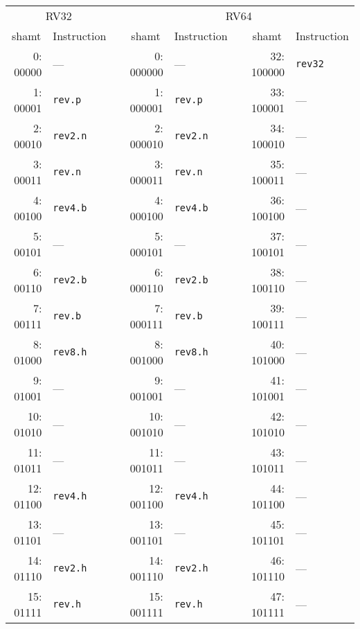 \begin{table}[t]
\begin{small}
\begin{center}
\begin{tabular}{r l p{0.5in} r l p{0.3in} r l}

\multicolumn{2}{c}{RV32} & &
\multicolumn{5}{c}{RV64} \\

\cline{1-2}
\cline{4-8}

\multicolumn{1}{c}{shamt} & Instruction & &
\multicolumn{1}{c}{shamt} & Instruction & &
\multicolumn{1}{c}{shamt} & Instruction \\

\cline{1-2}
\cline{4-5}
\cline{7-8}

 0: 00000 & ---           &   &  0: 000000 & ---           &   & 32: 100000 & {\tt rev32} \\
 1: 00001 & {\tt rev.p}   &   &  1: 000001 & {\tt rev.p}   &   & 33: 100001 & ---         \\
 2: 00010 & {\tt rev2.n}  &   &  2: 000010 & {\tt rev2.n}  &   & 34: 100010 & ---         \\
 3: 00011 & {\tt rev.n}   &   &  3: 000011 & {\tt rev.n}   &   & 35: 100011 & ---         \\
 4: 00100 & {\tt rev4.b}  &   &  4: 000100 & {\tt rev4.b}  &   & 36: 100100 & ---         \\
 5: 00101 & ---           &   &  5: 000101 & ---           &   & 37: 100101 & ---         \\
 6: 00110 & {\tt rev2.b}  &   &  6: 000110 & {\tt rev2.b}  &   & 38: 100110 & ---         \\
 7: 00111 & {\tt rev.b}   &   &  7: 000111 & {\tt rev.b}   &   & 39: 100111 & ---         \\

\cline{1-2}
\cline{4-5}
\cline{7-8}

 8: 01000 & {\tt rev8.h}  &   &  8: 001000 & {\tt rev8.h}  &   & 40: 101000 & ---         \\
 9: 01001 & ---           &   &  9: 001001 & ---           &   & 41: 101001 & ---         \\
10: 01010 & ---           &   & 10: 001010 & ---           &   & 42: 101010 & ---         \\
11: 01011 & ---           &   & 11: 001011 & ---           &   & 43: 101011 & ---         \\
12: 01100 & {\tt rev4.h}  &   & 12: 001100 & {\tt rev4.h}  &   & 44: 101100 & ---         \\
13: 01101 & ---           &   & 13: 001101 & ---           &   & 45: 101101 & ---         \\
14: 01110 & {\tt rev2.h}  &   & 14: 001110 & {\tt rev2.h}  &   & 46: 101110 & ---         \\
15: 01111 & {\tt rev.h}   &   & 15: 001111 & {\tt rev.h}   &   & 47: 101111 & ---         \\


\end{tabular}
\end{center}
\end{small}
\end{table}

